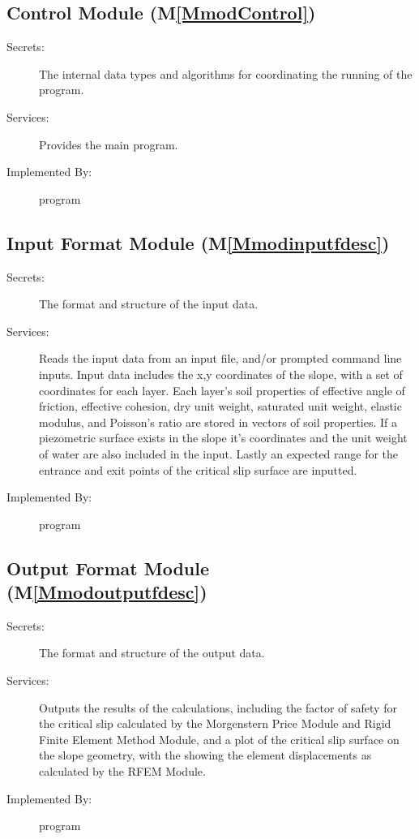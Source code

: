 \documentclass[12pt]{article}
\begin{document}
\subsection{Control Module (M\ref{MmodControl})}
\label{Sec:CM()}
\begin{description}
\item[Secrets:]The internal data types and algorithms for coordinating the running of the program.
\item[Services:]Provides the main program.
\item[Implemented By:]program
\end{description}
\subsection{Input Format Module (M\ref{Mmodinputfdesc})}
\label{Sec:IFM()}
\begin{description}
\item[Secrets:]The format and structure of the input data.
\item[Services:]Reads the input data from an input file, and/or prompted command line inputs. Input data includes the x,y coordinates of the slope, with a set of coordinates for each layer. Each layer's soil properties of effective angle of friction, effective cohesion, dry unit weight, saturated unit weight, elastic modulus, and Poisson's ratio are stored in vectors of soil properties. If a piezometric surface exists in the slope it's coordinates and the unit weight of water are also included in the input. Lastly an expected range for the entrance and exit points of the critical slip surface are inputted.
\item[Implemented By:]program
\end{description}
\subsection{Output Format Module (M\ref{Mmodoutputfdesc})}
\label{Sec:OFM()}
\begin{description}
\item[Secrets:]The format and structure of the output data.
\item[Services:]Outputs the results of the calculations, including the factor of safety for the critical slip calculated by the Morgenstern Price Module and Rigid Finite Element Method Module, and a plot of the critical slip surface on the slope geometry, with the showing the element displacements as calculated by the RFEM Module.
\item[Implemented By:]program
\end{description}
\end{document}
